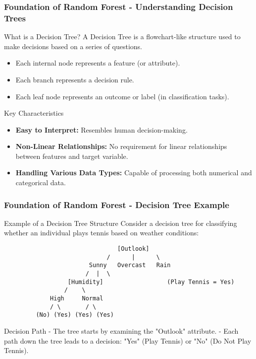 \documentclass[aspectratio=169]{beamer}
\begin{document}
\begin{frame}[fragile]
    \frametitle{Foundation of Random Forest - Understanding Decision Trees}
    \begin{block}{What is a Decision Tree?}
        A Decision Tree is a flowchart-like structure used to make decisions based on a series of questions. 
        \begin{itemize}
            \item Each internal node represents a feature (or attribute).
            \item Each branch represents a decision rule.
            \item Each leaf node represents an outcome or label (in classification tasks).
        \end{itemize}
    \end{block}

    \begin{block}{Key Characteristics}
        \begin{itemize}
            \item \textbf{Easy to Interpret:} Resembles human decision-making.
            \item \textbf{Non-Linear Relationships:} No requirement for linear relationships between features and target variable.
            \item \textbf{Handling Various Data Types:} Capable of processing both numerical and categorical data.
        \end{itemize}
    \end{block}
\end{frame}

\begin{frame}[fragile]
    \frametitle{Foundation of Random Forest - Decision Tree Example}
    \begin{block}{Example of a Decision Tree Structure}
        Consider a decision tree for classifying whether an individual plays tennis based on weather conditions:
        \begin{verbatim}
                                [Outlook]
                             /      |      \
                        Sunny   Overcast   Rain
                       /  |  \                 
                  [Humidity]                  (Play Tennis = Yes)
                 /    \
             High     Normal  
             / \       / \
         (No) (Yes) (Yes) (Yes)
        \end{verbatim}
    \end{block}

    \begin{block}{Decision Path}
        - The tree starts by examining the "Outlook" attribute.
        - Each path down the tree leads to a decision: "Yes" (Play Tennis) or "No" (Do Not Play Tennis).
    \end{block}
\end{frame}
\end{document}
